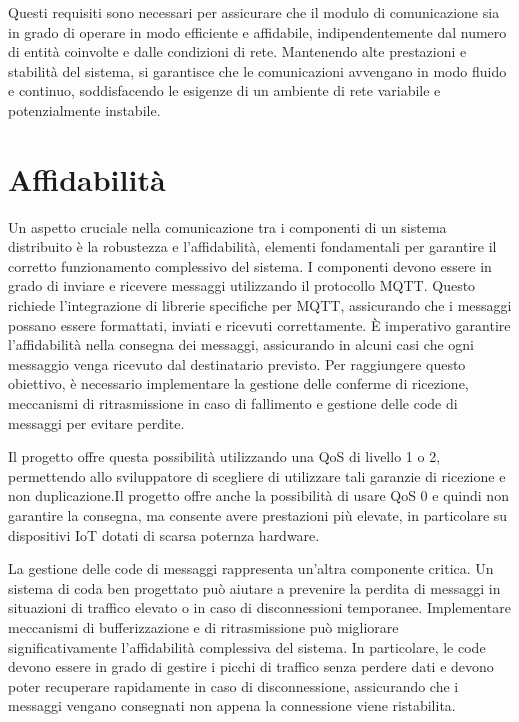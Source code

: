 \documentclass[12pt,a4paper,openright,twoside]{book}
\begin{document}
Questi requisiti sono necessari per assicurare che il modulo di comunicazione sia in grado di operare in modo efficiente e affidabile, 
indipendentemente dal numero di entità coinvolte e dalle condizioni di rete. Mantenendo alte prestazioni e stabilità del sistema, si garantisce che le comunicazioni 
avvengano in modo fluido e continuo, soddisfacendo le esigenze di un ambiente di rete variabile e potenzialmente instabile.

\section{Affidabilità}

Un aspetto cruciale nella comunicazione tra i componenti di un sistema distribuito è la robustezza e l'affidabilità, elementi fondamentali per garantire 
il corretto funzionamento complessivo del sistema. I componenti devono essere in grado di inviare e ricevere messaggi utilizzando il protocollo \ac{MQTT}. 
Questo richiede l'integrazione di librerie specifiche per \ac{MQTT}, assicurando che i messaggi possano essere formattati, inviati e ricevuti correttamente. 
È imperativo garantire l'affidabilità nella consegna dei messaggi, assicurando in alcuni casi che ogni messaggio venga ricevuto dal destinatario previsto. 
Per raggiungere questo obiettivo, è necessario implementare la gestione delle conferme di ricezione, meccanismi di ritrasmissione in caso di fallimento e 
gestione delle code di messaggi per evitare perdite.

Il progetto offre questa possibilità utilizzando una \ac{QoS} di livello 1 o 2, permettendo allo sviluppatore di scegliere di utilizzare tali garanzie di ricezione 
e non duplicazione.Il progetto offre anche la possibilità di usare \ac{QoS} 0 e quindi non garantire la consegna, ma consente avere prestazioni più elevate, 
in particolare su dispositivi \ac{IoT} dotati di scarsa poternza hardware.

La gestione delle code di messaggi rappresenta un'altra componente critica. Un sistema di coda ben progettato può aiutare a prevenire la perdita di messaggi in 
situazioni di traffico elevato o in caso di disconnessioni temporanee. Implementare meccanismi di bufferizzazione e di ritrasmissione può migliorare significativamente 
l'affidabilità complessiva del sistema. In particolare, le code devono essere in grado di gestire i picchi di traffico senza perdere dati e devono poter recuperare 
rapidamente in caso di disconnessione, assicurando che i messaggi vengano consegnati non appena la connessione viene ristabilita.
\end{document}
